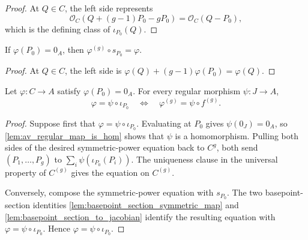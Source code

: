 \begin{proof}
  At \(Q\in C\), the left side represents
  \[
    \mathcal O_C(Q+(g-1)P_0-gP_0)=\mathcal O_C(Q-P_0),
  \]
  which is the defining class of \(\iota_{P_0}(Q)\).
\end{proof}

\begin{lemma}
  \label{lem:basepoint_section_symmetric_map}

  If \(\varphi(P_0)=0_A\), then
  \(\varphi^{(g)}\circ s_{P_0}=\varphi\).
\end{lemma}

\begin{proof}
  At \(Q\in C\), the left side is
  \(\varphi(Q)+(g-1)\varphi(P_0)=\varphi(Q)\).
\end{proof}

\begin{lemma}
  \label{lem:albanese_eq_iff_symmetricPower_eq}

  Let \(\varphi\colon C\to A\) satisfy \(\varphi(P_0)=0_A\).  For every
  regular morphism \(\psi\colon J\to A\),
  \[
    \varphi=\psi\circ\iota_{P_0}
      \quad\Longleftrightarrow\quad
    \varphi^{(g)}=\psi\circ f^{(g)}.
  \]
\end{lemma}

\begin{proof}
  Suppose first that \(\varphi=\psi\circ\iota_{P_0}\).  Evaluating at
  \(P_0\) gives \(\psi(0_J)=0_A\), so
  \cref{lem:av_regular_map_is_hom} shows that \(\psi\) is a homomorphism.
  Pulling both sides of the desired symmetric-power equation back to
  \(C^g\), both send \((P_1,\ldots,P_g)\) to
  \(\sum_i\psi(\iota_{P_0}(P_i))\).  The uniqueness clause in the
  universal property of \(C^{(g)}\) gives the equation on \(C^{(g)}\).

  Conversely, compose the symmetric-power equation with
  \(s_{P_0}\).  The two basepoint-section identities
  \cref{lem:basepoint_section_symmetric_map} and
  \cref{lem:basepoint_section_to_jacobian} identify the resulting equation
  with \(\varphi=\psi\circ\iota_{P_0}\).  Hence
  \(\varphi=\psi\circ\iota_{P_0}\).
\end{proof}

